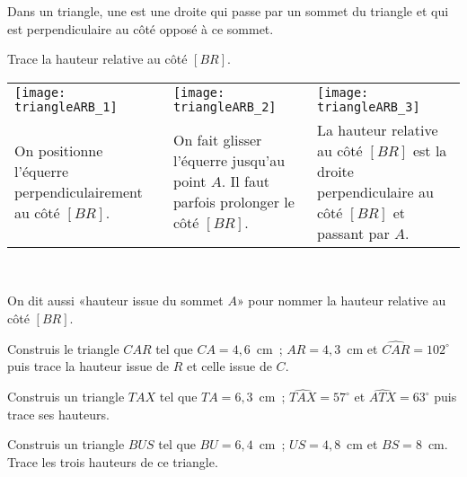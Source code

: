 \begin{methode*1}

\begin{aconnaitre}
Dans un triangle, une  est une droite qui passe par un sommet du triangle et qui est perpendiculaire au côté opposé à ce sommet.
\end{aconnaitre}

 \begin{exemple*1}
 Trace la hauteur relative au côté $[BR]$.
 \begin{tabularx}{\textwidth}{X|X|X}
 \texttt{[image: triangleARB\_1]} &  \texttt{[image: triangleARB\_2]} & \texttt{[image: triangleARB\_3]} \\ 
 On positionne l'équerre perpendiculairement au côté $[BR]$. & On fait glisser l'équerre jusqu'au point $A$. Il faut parfois prolonger le côté $[BR]$. & La hauteur relative au côté $[BR]$ est la droite perpendiculaire au côté $[BR]$ et passant par $A$. \\
\end{tabularx} \\

\end{exemple*1}

\begin{remarque}
On dit aussi «hauteur issue du sommet $A$» pour nommer la hauteur relative au côté $[BR]$.
 \end{remarque}
 
\exercice
Construis le triangle $CAR$ tel que $CA = 4,6$ cm ; $AR = 4,3$ cm et $\widehat{CAR} = 102^\circ$ puis trace la hauteur issue de $R$ et celle issue de $C$.
     
\exercice
Construis un triangle $TAX$ tel que $TA = 6,3$ cm ; $\widehat{TAX} = 57^\circ$ et $\widehat{ATX} = 63^\circ$ puis trace ses hauteurs.

\exercice
Construis un triangle $BUS$ tel que $BU = 6,4$ cm ; $US = 4,8$ cm et $BS = 8$ cm. Trace les trois hauteurs de ce triangle.

\end{methode*1}


 
